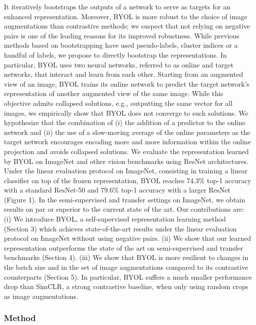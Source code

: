 \documentclass[
]{krantz}
\begin{document}
It iteratively bootstraps the outputs of a network to serve as targets for an enhanced representation. Moreover, BYOL is more robust to the choice of image augmentations than contrastive methods; we suspect that not relying on negative pairs is one of the leading reasons for its improved robustness. While previous methods based on bootstrapping have used pseudo-labels, cluster indices or a handful of labels, we propose to directly bootstrap the representations. In particular, BYOL uses two neural networks, referred to as online and target networks, that interact and learn from each other. Starting from an augmented view of an image, BYOL trains its online network to predict the target network's representation of another augmented view of the same image. While this objective admits collapsed solutions, e.g., outputting the same vector for all images, we empirically show that BYOL does not converge to such solutions. We hypothesize that the combination of
(i) the addition of a predictor to the online network and
(ii) the use of a slow-moving average of the online parameters as the target network encourages encoding more and more information within the online projection and avoids collapsed solutions.
We evaluate the representation learned by BYOL on ImageNet and other vision benchmarks using ResNet architectures. Under the linear evaluation protocol on ImageNet, consisting in training a linear classifier on top of the frozen representation, BYOL reaches 74.3\% top-1 accuracy with a standard ResNet-50 and 79.6\% top-1 accuracy with a larger ResNet (Figure 1). In the semi-supervised and transfer settings on ImageNet, we obtain results on par or superior to the current state of the art. Our contributions are: (i) We introduce BYOL, a self-supervised representation learning method (Section 3) which achieves state-of-the-art results under the linear evaluation protocol on ImageNet without using negative pairs. (ii) We show that our learned representation outperforms the state of the art on semi-supervised and transfer benchmarks (Section 4). (iii) We show that BYOL is more resilient to changes in the batch size and in the set of image augmentations compared to its contrastive counterparts (Section 5). In particular, BYOL suffers a much smaller performance drop than SimCLR, a strong contrastive baseline, when only using random crops as image augmentations.

\hypertarget{method-1}{%
\subsubsection{Method}\label{method-1}}
\end{document}
